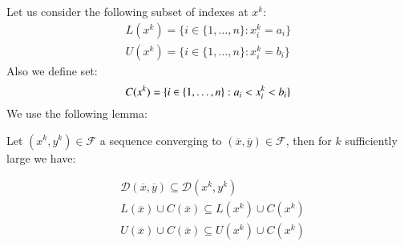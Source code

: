 Let us consider the following subset of indexes at $x^k$:
\begin{equation}
 \begin{aligned}
   L(x^k) =\{ i \in\{1,\ldots,n \}: x^k_i = a_i\}\\
  U(x^k) =\{i \in\{1,\ldots,n \} : x^k_i = b_i\}
 \end{aligned}
\end{equation}
Also we define set:
\begin{equation}
 C(x^k)=\{ i \in\{1,\ldots,n \}: a_i<x^k_i < b_i\}\\
\end{equation}
We use the following lemma:
\begin{lemma}\label{lem:direction}
 Let ${(x^k,y^k)} \in \mathcal{F}$ a sequence converging to $(\overline{x},\overline{y}) \in \mathcal{F}$, then for $k$ sufficiently large we have:
 
 \begin{subequations}
 \begin{align}
& \mathcal{D}(\overline{x},\overline{y}) \subseteq \mathcal{D}(x^k,y^k)\\
&L(\overline{x})\cup C(\overline{x})  \subseteq L(x^k)\cup C(x^k)\\
&U(\overline{x})\cup C(\overline{x})  \subseteq U(x^k)\cup C(x^k)
\end{align}
 \end{subequations}

\end{lemma}

